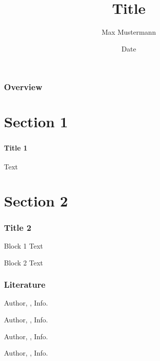 \documentclass[beamer,compress,t]{beamer}
\title[Titel]{Title}
\author[Auth.]{Max Mustermann}
\institute[MPI MIS]{MPI MIS Leipzig}
\date[Date]{Date}
\begin{document}
\begin{frame}[plain]
  \titlepage
\end{frame}

\begin{frame}
  \frametitle{Overview}

  \tableofcontents
\end{frame}


\section{Section 1}


\begin{frame}
  \frametitle{\insertsection}
  \framesubtitle{Title 1}

  Text


\end{frame}

\section{Section 2}

\begin{frame}
  \frametitle{Title 2}

  \begin{block}{Block 1}
    Text
  \end{block}
  \pause

  \begin{block}{Block 2}
    Text
  \end{block}
\end{frame}


\begin{frame}
  \frametitle{Literature}
  \small
  \begin{thebibliography}{9}

  \beamertemplatebookbibitems

    Author,
    ,
    \newblock Info.

  \beamertemplatearticlebibitems

    Author,
    ,
    \newblock Info.

    Author,
    ,
    \newblock Info.

    Author,
    ,
    \newblock Info.

  \end{thebibliography}
\end{frame}
\end{document}
